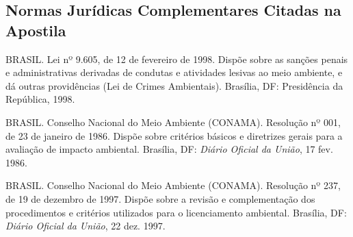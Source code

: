 \vspace{8pt}
\subsection*{Normas Jurídicas Complementares Citadas na Apostila}

\begin{list}{}{%
  \setlength{\leftmargin}{1.6em}%
  \setlength{\itemindent}{-1.6em}%
  \setlength{\itemsep}{4.5pt}%
  \setlength{\parsep}{0pt}%
  \setlength{\topsep}{4pt}%
}
\small
  \item BRASIL. Lei nº 9.605, de 12 de fevereiro de 1998. Dispõe sobre as sanções penais e administrativas derivadas de condutas e atividades lesivas ao meio ambiente, e dá outras providências (Lei de Crimes Ambientais). Brasília, DF: Presidência da República, 1998.

  \item BRASIL. Conselho Nacional do Meio Ambiente (CONAMA). Resolução nº 001, de 23 de janeiro de 1986. Dispõe sobre critérios básicos e diretrizes gerais para a avaliação de impacto ambiental. Brasília, DF: \textit{Diário Oficial da União}, 17 fev. 1986.

  \item BRASIL. Conselho Nacional do Meio Ambiente (CONAMA). Resolução nº 237, de 19 de dezembro de 1997. Dispõe sobre a revisão e complementação dos procedimentos e critérios utilizados para o licenciamento ambiental. Brasília, DF: \textit{Diário Oficial da União}, 22 dez. 1997.
\end{list}
